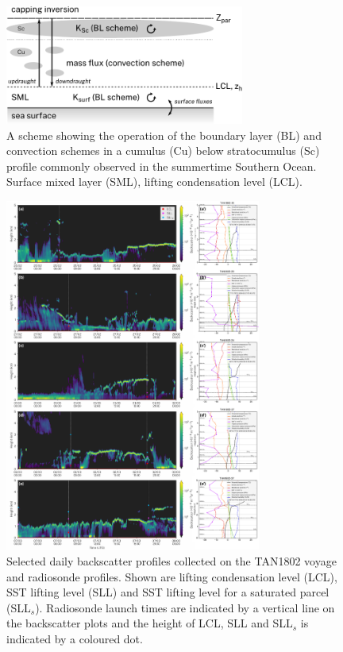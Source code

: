 \clearpage

\begin{figure}[t]
\centering
\includegraphics[width=0.7\textwidth]{chapter4/fig/scheme.pdf}
\caption{A scheme showing the operation of the boundary layer (BL)
and convection schemes in a cumulus (Cu) below stratocumulus (Sc) profile
commonly observed in the summertime Southern Ocean. Surface mixed layer (SML),
lifting condensation level (LCL).
}
\label{fig:scheme}
\end{figure}

\clearpage

\begin{figure}[t]
\centering
\includegraphics[width=0.75\textwidth]{chapter4/fig/backscatter_rs.pdf}
\caption{Selected daily backscatter profiles collected on the TAN1802 voyage
and radiosonde profiles. Shown are lifting condensation level (LCL),
SST lifting level (SLL) and SST lifting level for a saturated parcel (SLL$_s$).
Radiosonde launch times are indicated by a vertical line on the backscatter
plots and the height of LCL, SLL and SLL$_s$ is indicated by a coloured dot.
}
\label{fig:backscatter-rs}
\end{figure}

